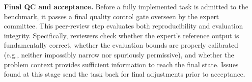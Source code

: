 \noindent \textbf{Final QC and acceptance.}
Before a fully implemented task is admitted to the benchmark, it passes a final quality control gate overseen by the expert committee. This peer-review step evaluates both reproducibility and evaluation integrity. Specifically, reviewers check whether the expert's reference output is fundamentally correct, whether the evaluation bounds are properly calibrated (e.g., neither impossibly narrow nor spuriously permissive), and whether the problem context provides sufficient information to reach the final state. Issues found at this stage send the task back for final adjustments prior to acceptance.
